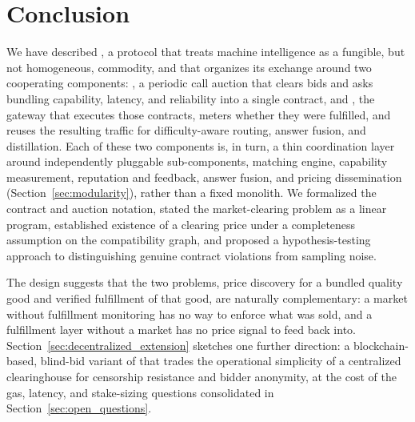 \section{Conclusion}
\label{sec:conclusion}

We have described \Noesis, a protocol that treats machine intelligence as
a fungible, but not homogeneous, commodity, and that organizes its
exchange around two cooperating components: \NoesisMarket, a periodic
call auction that clears bids and asks bundling capability, latency, and
reliability into a single contract, and \NoesisServer, the gateway that
executes those contracts, meters whether they were fulfilled, and reuses
the resulting traffic for difficulty-aware routing, answer fusion, and
distillation. Each of these two components is, in turn, a thin
coordination layer around independently pluggable sub-components, matching
engine, capability measurement, reputation and feedback, answer fusion, and
pricing dissemination (Section~\ref{sec:modularity}), rather than a fixed
monolith. We formalized the contract and auction notation, stated the
market-clearing problem as a linear program, established existence of a
clearing price under a completeness assumption on the compatibility
graph, and proposed a hypothesis-testing approach to distinguishing
genuine contract violations from sampling noise.

The design suggests that the two problems, price discovery for a bundled
quality good and verified fulfillment of that good, are naturally
complementary: a market without fulfillment monitoring has no way to
enforce what was sold, and a fulfillment layer without a market has no
price signal to feed back into. Section~\ref{sec:decentralized_extension}
sketches one further direction: a blockchain-based, blind-bid variant of
\NoesisMarket{} that trades the operational simplicity of a centralized
clearinghouse for censorship resistance and bidder anonymity, at the cost
of the gas, latency, and stake-sizing questions consolidated in
Section~\ref{sec:open_questions}.


